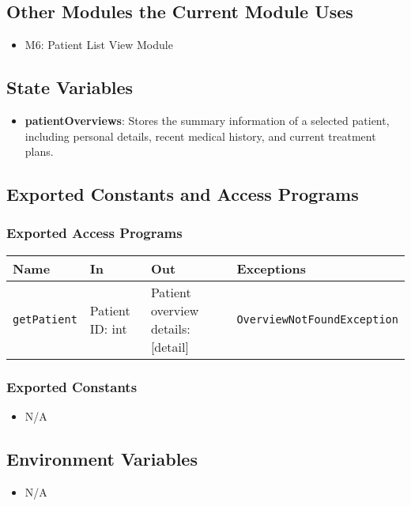 \documentclass[12pt, titlepage]{article}
\begin{document}
\subsection{Other Modules the Current Module Uses}
\begin{itemize}
  \item M6: Patient List View Module
\end{itemize}

\subsection{State Variables}
\begin{itemize}
\item \textbf{patientOverviews}: Stores the summary information of a selected patient, including personal details, recent medical history, and current treatment plans.
\end{itemize}

\subsection{Exported Constants and Access Programs}
\subsubsection{Exported Access Programs}
\begin{tabular}{|l|l|l|l|}
    \hline
    \textbf{Name} & \textbf{In} & \textbf{Out} & \textbf{Exceptions} \\
    \hline 
    \texttt{getPatient} & Patient ID: int & Patient overview details: [detail] & \texttt{OverviewNotFoundException} \\
    \hline
\end{tabular}

\subsubsection{Exported Constants}
\begin{itemize}
\item N/A
\end{itemize}

\subsection{Environment Variables}
\begin{itemize}
\item N/A
\end{itemize}
\end{document}
